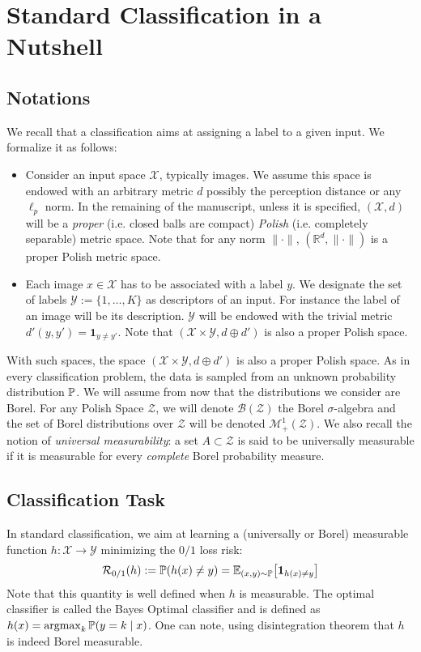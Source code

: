 \section{Standard Classification in a Nutshell}

\subsection{Notations}
We recall that a classification aims at assigning a label to a given input. We  formalize it as follows:
\begin{itemize}
    \item Consider an input space $\mathcal{X}$, typically images. We assume this space is endowed with an arbitrary metric $d$ possibly the perception distance or any $\ell_p$ norm. In the remaining of the manuscript, unless it is specified, $(\mathcal{X},d)$ will be a \textit{proper} (i.e. closed balls are compact) \textit{Polish} (i.e. completely separable) metric space. Note that for any norm $\lVert\cdot\rVert$,  $(\mathbb{R}^d,\lVert\cdot\rVert)$ is a proper Polish metric space.
    \item Each image $x\in \mathcal{X}$ has to be associated with  a label $y$. We designate the set of labels $\mathcal{Y}:=\{1,\dots,K\}$ as descriptors of an input. For instance the label of an image will be its description. $\mathcal{Y}$ will be endowed with the trivial metric  $d'(y,y') = \mathbf{1}_{y\neq y'}$. Note that $(\mathcal{X}\times\mathcal{Y},d\oplus d')$ is also a proper Polish space.
\end{itemize}
With such spaces, the space $(\mathcal{X}\times\mathcal{Y},d\oplus d')$ is also a proper Polish space. As in every classification problem, the data is sampled from an unknown probability distribution $\mathbb{P}$. We will assume from now that the distributions we consider are Borel. For any Polish Space $\mathcal{Z}$, we will denote $\mathcal{B}(\mathcal{Z})$ the Borel $\sigma$-algebra and the set of Borel distributions over $\mathcal{Z}$  will be denoted $\mathcal{M}_+^1(\mathcal{Z})$. We also recall the notion of \textit{universal measurability}: a set $A\subset \mathcal{Z}$ is said to be universally measurable if it is measurable for every \textit{complete} Borel probability measure.

\subsection{Classification Task}
In standard classification, we aim at learning a (universally or Borel) measurable function $h:\mathcal{X}\to\mathcal{Y}$ minimizing the $0/1$ loss risk:
\begin{align}
   \risk_{0/1}(h):=\PP(h(x)\neq y) = \EE_{(x,y)\sim\PP}\left[\mathbf{1}_{h(x)\neq y}\right]
\end{align}
Note that this quantity is well defined when $h$ is measurable. The optimal classifier is called the Bayes Optimal classifier and is defined as $h(x) = \operatorname*{argmax}_k\mathbb{P}(y=k\mid x)$. One can note, using disintegration theorem that $h$ is indeed Borel measurable.

